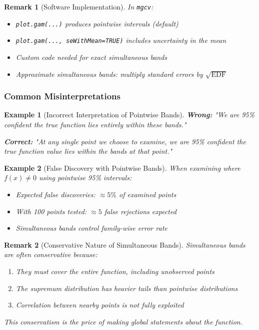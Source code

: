 \documentclass[12pt]{article}
\newtheorem{remark}{Remark}
\newtheorem{example}{Example}
\begin{document}
\begin{remark}[Software Implementation]
In \texttt{mgcv}:
\begin{itemize}
   \item \texttt{plot.gam(...)} produces pointwise intervals (default)
   \item \texttt{plot.gam(..., seWithMean=TRUE)} includes uncertainty in the mean
   \item Custom code needed for exact simultaneous bands
   \item Approximate simultaneous bands: multiply standard errors by $\sqrt{\text{EDF}}$
\end{itemize}
\end{remark}

\subsubsection{Common Misinterpretations}

\begin{example}[Incorrect Interpretation of Pointwise Bands]
\textbf{Wrong:} "We are 95\% confident the true function lies entirely within these bands."

\textbf{Correct:} "At any single point we choose to examine, we are 95\% confident the true function value lies within the bands at that point."
\end{example}

\begin{example}[False Discovery with Pointwise Bands]
When examining where $f(x) \neq 0$ using pointwise 95\% intervals:
\begin{itemize}
   \item Expected false discoveries: $\approx 5\%$ of examined points
   \item With 100 points tested: $\approx 5$ false rejections expected
   \item Simultaneous bands control family-wise error rate
\end{itemize}
\end{example}

\begin{remark}[Conservative Nature of Simultaneous Bands]
Simultaneous bands are often conservative because:
\begin{enumerate}
   \item They must cover the entire function, including unobserved points
   \item The supremum distribution has heavier tails than pointwise distributions
   \item Correlation between nearby points is not fully exploited
\end{enumerate}
This conservatism is the price of making global statements about the function.
\end{remark}
\end{document}
